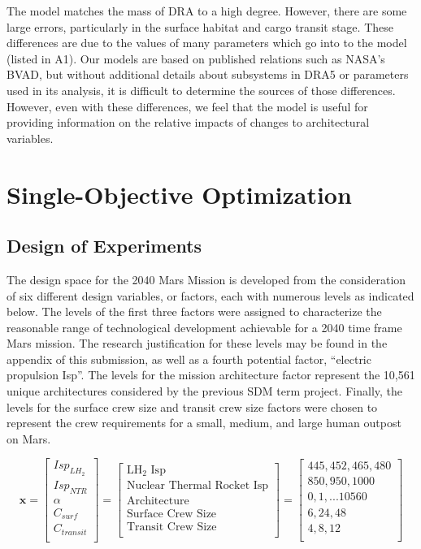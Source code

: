\documentclass[]{aiaa-pretty}
\begin{document}
The model matches the mass of DRA to a high degree. However, there are some large errors, particularly in the surface habitat and cargo transit stage. These differences are due to the values of many parameters which go into to the model (listed in A1). Our models are based on published relations such as NASA's BVAD, but without additional details about subsystems in DRA5 or parameters used in its analysis, it is difficult to determine the sources of those differences. However, even with these differences, we feel that the model is useful for providing information on the relative impacts of changes to architectural variables. 
\section{Single-Objective Optimization}
\label{sec:single}
\subsection{Design of Experiments}
\label{sec:DOE}
The design space for the 2040 Mars Mission is developed from the consideration of six different design variables, or factors, each with numerous levels as indicated below. The levels of the first three factors were assigned to characterize the reasonable range of technological development achievable for a 2040 time frame Mars mission. The research justification for these levels may be found in the appendix of this submission, as well as a fourth potential factor, “electric propulsion Isp”. The levels for the mission architecture factor represent the 10,561 unique architectures considered by the previous SDM term project. Finally, the levels for the surface crew size and transit crew size factors were chosen to represent the crew requirements for a small, medium, and large human outpost on Mars.

\begin{equation*}
\mathbf{x}=
\begin{bmatrix}
Isp_{LH_2}\\
Isp_{NTR}\\
\alpha\\
C_{surf}\\
C_{transit}\\
\end{bmatrix}
=
\begin{bmatrix}
\mbox{LH}_2\mbox{ Isp}\\
\mbox{Nuclear Thermal Rocket Isp}\\
\mbox{Architecture}\\
\mbox{Surface Crew Size}\\
\mbox{Transit Crew Size}\\
\end{bmatrix}
=
\begin{bmatrix}
445,452,465,480\\
850,950,1000\\
0,1,...10560\\
6,24,48\\
4,8,12\\
\end{bmatrix}
\end{equation*}
\end{document}
